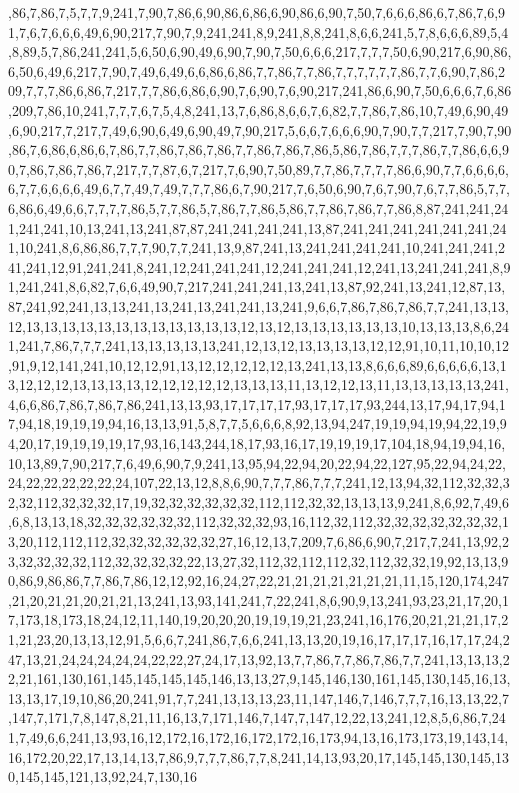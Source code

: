 ,86,7,86,7,5,7,7,9,241,7,90,7,86,6,90,86,6,86,6,90,86,6,90,7,50,7,6,6,6,86,6,7,86,7,6,91,7,6,7,6,6,6,49,6,90,217,7,90,7,9,241,241,8,9,241,8,8,241,8,6,6,241,5,7,8,6,6,6,89,5,4,8,89,5,7,86,241,241,5,6,50,6,90,49,6,90,7,90,7,50,6,6,6,217,7,7,7,50,6,90,217,6,90,86,6,50,6,49,6,217,7,90,7,49,6,49,6,6,86,6,86,7,7,86,7,7,86,7,7,7,7,7,7,86,7,7,6,90,7,86,209,7,7,7,86,6,86,7,217,7,7,86,6,86,6,90,7,6,90,7,6,90,217,241,86,6,90,7,50,6,6,6,7,6,86,209,7,86,10,241,7,7,7,6,7,5,4,8,241,13,7,6,86,8,6,6,7,6,82,7,7,86,7,86,10,7,49,6,90,49,6,90,217,7,217,7,49,6,90,6,49,6,90,49,7,90,217,5,6,6,7,6,6,6,90,7,90,7,7,217,7,90,7,90,86,7,6,86,6,86,6,7,86,7,7,86,7,86,7,86,7,7,86,7,86,7,86,5,86,7,86,7,7,7,86,7,7,86,6,6,90,7,86,7,86,7,86,7,217,7,7,87,6,7,217,7,6,90,7,50,89,7,7,86,7,7,7,7,86,6,90,7,7,6,6,6,6,6,7,7,6,6,6,6,49,6,7,7,49,7,49,7,7,7,86,6,7,90,217,7,6,50,6,90,7,6,7,90,7,6,7,7,86,5,7,7,6,86,6,49,6,6,7,7,7,7,86,5,7,7,86,5,7,86,7,7,86,5,86,7,7,86,7,86,7,7,86,8,87,241,241,241,241,241,10,13,241,13,241,87,87,241,241,241,241,13,87,241,241,241,241,241,241,241,10,241,8,6,86,86,7,7,7,90,7,7,241,13,9,87,241,13,241,241,241,241,10,241,241,241,241,241,12,91,241,241,8,241,12,241,241,241,12,241,241,241,12,241,13,241,241,241,8,91,241,241,8,6,82,7,6,6,49,90,7,217,241,241,241,13,241,13,87,92,241,13,241,12,87,13,87,241,92,241,13,13,241,13,241,13,241,241,13,241,9,6,6,7,86,7,86,7,86,7,7,241,13,13,12,13,13,13,13,13,13,13,13,13,13,13,13,12,13,12,13,13,13,13,13,13,10,13,13,13,8,6,241,241,7,86,7,7,7,241,13,13,13,13,13,241,12,13,12,13,13,13,13,12,12,91,10,11,10,10,12,91,9,12,141,241,10,12,12,91,13,12,12,12,12,12,13,241,13,13,8,6,6,6,89,6,6,6,6,6,13,13,12,12,12,13,13,13,13,12,12,12,12,12,13,13,13,11,13,12,12,13,11,13,13,13,13,13,241,4,6,6,86,7,86,7,86,7,86,241,13,13,93,17,17,17,17,93,17,17,17,93,244,13,17,94,17,94,17,94,18,19,19,19,94,16,13,13,91,5,8,7,7,5,6,6,6,8,92,13,94,247,19,19,94,19,94,22,19,94,20,17,19,19,19,19,17,93,16,143,244,18,17,93,16,17,19,19,19,17,104,18,94,19,94,16,10,13,89,7,90,217,7,6,49,6,90,7,9,241,13,95,94,22,94,20,22,94,22,127,95,22,94,24,22,24,22,22,22,22,22,24,107,22,13,12,8,8,6,90,7,7,7,86,7,7,7,241,12,13,94,32,112,32,32,32,32,112,32,32,32,17,19,32,32,32,32,32,32,112,112,32,32,13,13,13,9,241,8,6,92,7,49,6,6,8,13,13,18,32,32,32,32,32,32,112,32,32,32,93,16,112,32,112,32,32,32,32,32,32,32,13,20,112,112,112,32,32,32,32,32,32,27,16,12,13,7,209,7,6,86,6,90,7,217,7,241,13,92,23,32,32,32,32,112,32,32,32,32,22,13,27,32,112,32,112,112,32,112,32,32,19,92,13,13,90,86,9,86,86,7,7,86,7,86,12,12,92,16,24,27,22,21,21,21,21,21,21,21,11,15,120,174,247,21,20,21,21,20,21,21,13,241,13,93,141,241,7,22,241,8,6,90,9,13,241,93,23,21,17,20,17,173,18,173,18,24,12,11,140,19,20,20,20,19,19,19,21,23,241,16,176,20,21,21,21,17,21,21,23,20,13,13,12,91,5,6,6,7,241,86,7,6,6,241,13,13,20,19,16,17,17,17,16,17,17,24,247,13,21,24,24,24,24,24,22,22,27,24,17,13,92,13,7,7,86,7,7,86,7,86,7,7,241,13,13,13,22,21,161,130,161,145,145,145,145,146,13,13,27,9,145,146,130,161,145,130,145,16,13,13,13,17,19,10,86,20,241,91,7,7,241,13,13,13,23,11,147,146,7,146,7,7,7,16,13,13,22,7,147,7,171,7,8,147,8,21,11,16,13,7,171,146,7,147,7,147,12,22,13,241,12,8,5,6,86,7,241,7,49,6,6,241,13,93,16,12,172,16,172,16,172,172,16,173,94,13,16,173,173,19,143,14,16,172,20,22,17,13,14,13,7,86,9,7,7,7,86,7,7,8,241,14,13,93,20,17,145,145,130,145,130,145,145,121,13,92,24,7,130,16